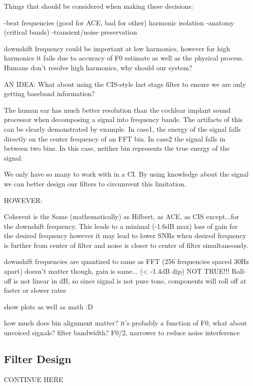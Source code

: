 \documentclass [11pt, proquest] {uwthesis}[2015/03/03]
\begin{document}
Things that should be considered when making these decisions:

-beat frequencies (good for ACE, bad for other)
    harmonic isolation
-anatomy (critical bands)
-transient/noise preservation

downshift frequency could be important at low harmonics, however for high harmonics it fails due to accuracy of F0 estimate as well as the physical process.  Humans don't resolve high harmonics, why should our system?


AN IDEA:
What about using the CIS-style last stage filter to ensure we are only getting baseband information?




The human ear has much better resolution than the cochlear implant sound processor when decomposing a signal into frequency bands.  The artifacts of this can be clearly demonstrated by example.  In case1, the energy of the signal falls directly on the center frequency of an FFT bin.  In case2 the signal falls in between two bins.  In this case, neither bin represents the true energy of the signal.

We only have so many to work with in a CI.  By using knowledge about the signal we can better design our filters to circumvent this limitation.

HOWEVER:

Coherent is the Same (mathematically) as Hilbert, as ACE, as CIS except...for the downshift frequency.  This leads to a minimal (-1.6dB max) loss of gain for the desired frequency however it may lead to lower SNRs when desired frequency is further from center of filter and noise is closer to center of filter simultaneously.

downshift frequencies are quantized to same as FFT (256 frequencies spaced 30Hz apart)
doesn't matter though, gain is same... (< -1.4dB dip)
NOT TRUE!!! Roll-off is not linear in dB, so since signal is not pure tone, components will roll off at faster or slower rates

show plots as well as math :D

how much does bin alignment matter?  it's probably a function of F0, what about unvoiced signals?
filter bandwidth? F0/2, narrower to reduce noise interference


\subsection{Filter Design}

CONTINUE HERE
\end{document}
